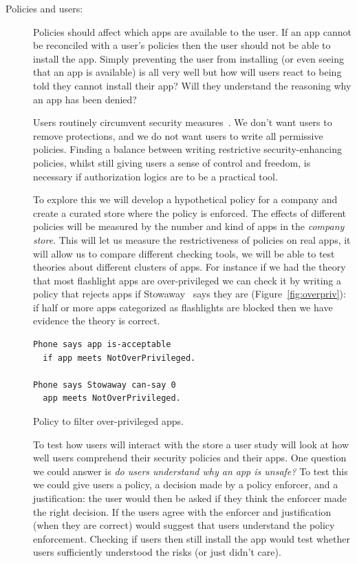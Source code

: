 \documentclass[a4paper]{article}
\begin{document}
\begin{description}

  \item[Policies and users:] Policies should affect which apps are
    available to the user. If an app cannot be reconciled with a user's policies
    then the user should not be able to install the app.  Simply preventing the
    user from installing (or even seeing that an app is available) is all very
    well but how will users react to being told they cannot install their app?
    Will they understand the reasoning why an app has been denied?  
    
    Users routinely circumvent security measures~\cite{Blythe:2013dt}. We don't
    want users to remove protections, and we do not want users to write all
    permissive policies.  Finding a balance between writing restrictive
    security-enhancing policies, whilst still giving users a sense of control
    and freedom, is necessary if authorization logics are to be a practical
    tool.

    To explore this we will develop a hypothetical policy for a company and
    create a curated store where the policy is enforced.  The effects of
    different policies will be measured by the number and kind of apps in the
    \emph{company store}.  This will let us measure the restrictiveness of
    policies on real apps, it will allow us to compare different checking tools,
    we will be able to test theories about different clusters of apps.  For
    instance if we had the theory that most flashlight apps are over-privileged
    we can check it by writing a policy that rejects apps if
    Stowaway~\cite{Felt:2011kj} says they are (Figure~\ref{fig:overpriv}): if
    half or more apps categorized as flashlights are blocked then we have
    evidence the theory is correct.

    \begin{marginfigure}
      \begin{lstlisting}[language=SecPAL]
Phone says app is-acceptable
  if app meets NotOverPrivileged.

Phone says Stowaway can-say 0
  app meets NotOverPrivileged.
      \end{lstlisting}
      \caption{Policy to filter over-privileged apps.}
      \label{fig:overpriv}
    \end{marginfigure}

    To test how users will interact with the store a user study will look at how
    well users comprehend their security policies and their apps.   One question
    we could answer is \emph{do users understand why an app is unsafe?}  To test
    this we could give users a policy, a decision made by a policy enforcer, and
    a justification:  the user would then be asked if they think the enforcer
    made the right decision.  If the users agree with the enforcer and
    justification (when they are correct) would suggest that users understand
    the policy enforcement.  Checking if users then still install the app would
    test whether users sufficiently understood the risks (or just didn't care).
    

\end{description}
\end{document}
